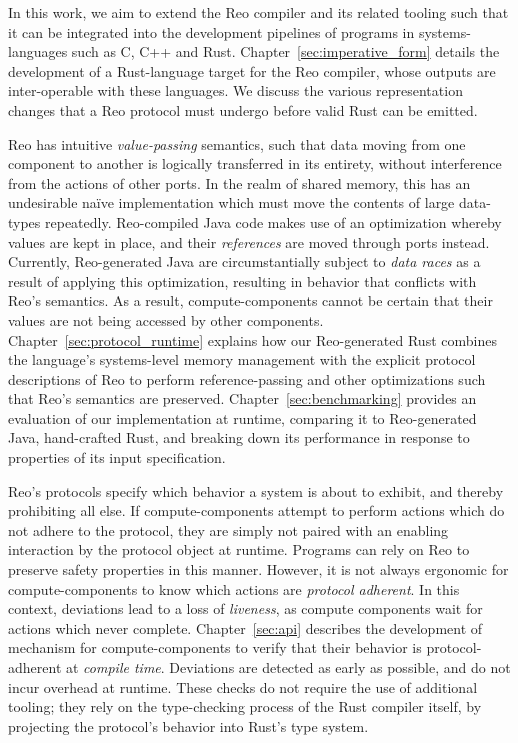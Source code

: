 In this work, we aim to extend the Reo compiler and its related tooling such that it can be integrated into the development pipelines of programs in systems-languages such as C, C++ and Rust. Chapter~\ref{sec:imperative_form} details the development of a Rust-language target for the Reo compiler, whose outputs are inter-operable with these languages. We discuss the various representation changes that a Reo protocol must undergo before valid Rust can be emitted.

Reo has intuitive \textit{value-passing} semantics, such that data moving from one component to another is logically transferred in its entirety, without interference from the actions of other ports. In the realm of shared memory, this has an undesirable na\"ive implementation which must move the contents of large data-types repeatedly. Reo-compiled Java code makes use of an optimization whereby values are kept in place, and their \textit{references} are moved through ports instead. Currently, Reo-generated Java are circumstantially subject to \textit{data races} as a result of applying this optimization, resulting in behavior that conflicts with Reo's semantics. As a result, compute-components cannot be certain that their values are not being accessed by other components. Chapter~\ref{sec:protocol_runtime} explains how our Reo-generated Rust combines the language's systems-level memory management with the explicit protocol descriptions of Reo to perform reference-passing and other optimizations such that Reo's semantics are preserved. Chapter~\ref{sec:benchmarking} provides an evaluation of our implementation at runtime, comparing it to Reo-generated Java, hand-crafted Rust, and breaking down its performance in response to properties of its input specification.

Reo's protocols specify which behavior a system is about to exhibit, and thereby prohibiting all else. If compute-components attempt to perform actions which do not adhere to the protocol, they are simply not paired with an enabling interaction by the protocol object at runtime. Programs can rely on Reo to preserve safety properties in this manner. However, it is not always ergonomic for compute-components to know which actions are \textit{protocol adherent}. In this context, deviations lead to a loss of \textit{liveness}, as compute components wait for actions which never complete. Chapter~\ref{sec:api} describes the development of mechanism for compute-components to verify that their behavior is protocol-adherent at \textit{compile time}. Deviations are detected as early as possible, and do not incur overhead at runtime. These checks do not require the use of additional tooling; they rely on the type-checking process of the Rust compiler itself, by projecting the protocol's behavior into Rust's type system.
